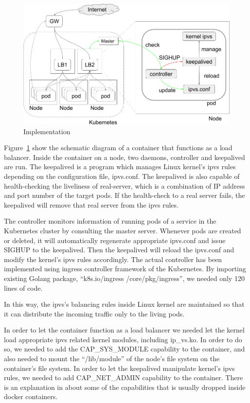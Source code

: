 \begin{figure}
\includegraphics[width=\columnwidth]{Figs/ipvs-ingress-schem}
\caption{Implementation}
\label{fig:ipvs-ingress-schem}
\end{figure}

Figure~\ref{fig:ipvs-ingress-schem} show the schematic diagram of a container that functions as a load balancer.
Inside the container on a node, two daemons, controller and keepalived are run.
The keepalived is a program which manages Linux kernel's ipvs rules depending on the configuration file, ipvs.conf.
The keepalived is also capable of health-checking the liveliness of real-server, 
which is a combination of IP address and port number of the target pods. 
If the health-check to a real server fails, the keepalived will remove that real server from the ipvs rules.

The controller monitors information of running pods of a service in the Kubernetes cluster by consulting the master server.
Whenever pods are created or deleted, it will automatically regenerate appropriate ipvs.conf and issue SIGHUP to the keepalived.
Then the keepalived will reload the ipvs.conf and modify the kernel's ipvs rules accordingly.  
The actual controller\cite{ktaka_ccmp_2017_826894} has been implemented using ingress controller\cite{K8sIngress2017} framework of the Kubernetes.
By importing existing Golang package, \enquote{k8s.io/ingress /core/pkg/ingress},
we needed only 120 lines of code.  

In this way, the ipvs's balancing rules inside Linux kernel are maintained so that it can distribute the incoming traffic only to the living pods.

In order to let the container function as a load balancer we needed let the 
kernel load appropriate ipvs related kernel modules, including ip\_vs.ko. 
In order to do so, 
we needed to add the CAP\_SYS\_MODULE capability to the container, 
and also needed to mount the \enquote{/lib/module} of the node's file system on the container's file system.   
In order to let the keepalived manipulate kernel's ipvs rules, 
we needed to add CAP\_NET\_ADMIN capability to the container.
There is an explanation in \cite{mp2016enhancing} about some of the capabilities 
that is usually dropped inside docker containers.

